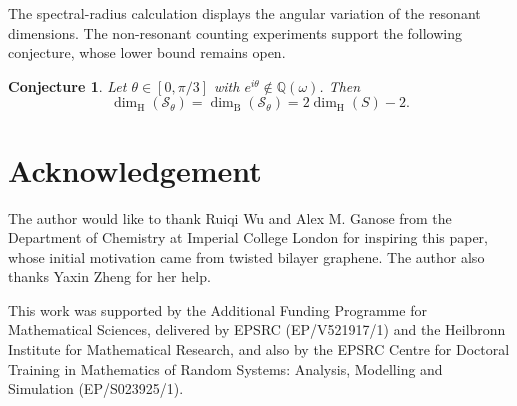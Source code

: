 \documentclass[scheme=plain]{ctexart}
\newtheorem{conjecture}[theorem]{Conjecture}
\newcommand{\dimbox}{\dim_\mathrm{B}}
\newcommand{\dimhaus}{\dim_\mathrm{H}}
\begin{document}
The spectral-radius calculation displays the angular variation of the resonant dimensions. The non-resonant counting experiments support the following conjecture, whose lower bound remains open.

\begin{conjecture}
\label{conj:non-resonant-dimension}
Let $\theta\in[0,\pi/3]$ with $e^{i\theta}\notin\mathbb Q(\omega)$.
Then
\[
\dimhaus(\mathcal S_\theta)=\dimbox(\mathcal S_\theta)=2\dimhaus(S)-2.
\]
\end{conjecture}

\section*{Acknowledgement}
The author would like to thank Ruiqi Wu and Alex M. Ganose from the Department of Chemistry at Imperial College London for inspiring this paper, whose initial motivation came from twisted bilayer graphene.
The author also thanks Yaxin Zheng for her help.


This work was supported by the Additional Funding Programme for Mathematical Sciences, delivered by EPSRC (EP/V521917/1) and the Heilbronn Institute for Mathematical Research, and also by the EPSRC Centre for Doctoral Training in Mathematics of Random Systems: Analysis, Modelling and Simulation (EP/S023925/1).







\end{document}
